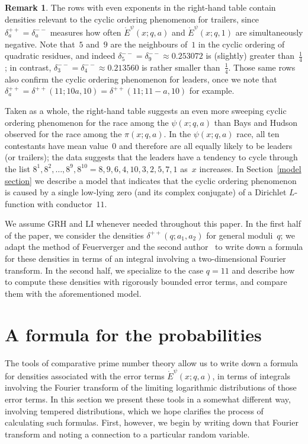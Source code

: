 \documentclass[11pt]{article}
\theoremstyle{plain}
\theoremstyle{definition}
\newtheorem{rem}[thm]{Remark}
\numberwithin{equation}{section}
\newcommand{\Edot}{\mathord{\mathring E}}
\newcommand{\0}{{\vec 0}}
\begin{document}
\begin{rem}
The rows with even exponents in the right-hand table contain densities relevant to the cyclic ordering phenomenon for trailers, since $\delta_a^{++} = \delta_a^{--}$ measures how often $\Edot^\psi(x;q,a)$ and $\Edot^\psi(x;q,1)$ are simultaneously negative. Note that~$5$ and~$9$ are the neighbours of~$1$ in the cyclic ordering of quadratic residues, and indeed $\delta_5^{--} = \delta_9^{--} \approx 0.253072$ is (slightly) greater than~$\frac14$; in contrast, $\delta_3^{--} = \delta_4^{--} \approx 0.213560$ is rather smaller than~$\frac14$. Those same rows also confirm the cyclic ordering phenomenon for leaders, once we note that $\delta_a^{++} = \delta^{++}(11;10a,10) = \delta^{++}(11;11-a,10)$ for example.

Taken as a whole, the right-hand table suggests an even more sweeping cyclic ordering phenomenon for the race among the $\psi(x;q,a)$ than Bays and Hudson observed for the race among the $\pi(x;q,a)$. In the $\psi(x;q,a)$ race, all ten contestants have mean value~$0$ and therefore are all equally likely to be leaders (or trailers); the data suggests that the leaders have a tendency to cycle through the list $8^1,8^2,\dots,8^9,8^{10} = 8,9,6,4,10,3,2,5,7,1$ as~$x$ increases. In Section~\ref{model section} we describe a model that indicates that the cyclic ordering phenomenon is caused by a single low-lying zero (and its complex conjugate) of a Dirichlet $L$-function with conductor~$11$.
\end{rem}

We assume GRH and LI whenever needed throughout this paper. In the first half of the paper, we consider the densities $\delta^{++}(q;a_1,a_2)$ for general moduli~$q$; we adapt the method of Feuerverger and the second author~\cite{BSRPNR} to write down a formula for these densities in terms of an integral involving a two-dimensional Fourier transform. In the second half, we specialize to the case $q=11$ and describe how to compute these densities with rigorously bounded error terms, and compare them with the aforementioned model.


\section{A formula for the probabilities}

The tools of comparative prime number theory allow us to write down a formula for densities associated with the error terms $\Edot^\psi(x;q,a)$, in terms of integrals involving the Fourier transform of the limiting logarithmic distributions of those error terms. In this section we present these tools in a somewhat different way, involving tempered distributions, which we hope clarifies the process of calculating such formulas. First, however, we begin by writing down that Fourier transform and noting a connection to a particular random variable.
\end{document}
